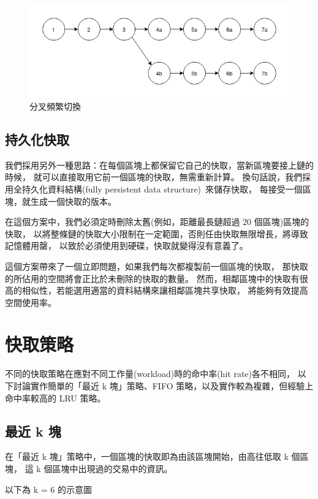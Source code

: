 \begin{figure}[h!]
\includegraphics[width=\textwidth]{快取長分叉}
\caption{分叉頻繁切換}
\end{figure}

{\color{red}
\subsection{持久化快取}

我們採用另外一種思路：在每個區塊上都保留它自己的快取，當新區塊要接上鏈的時候，
就可以直接取用它前一個區塊的快取，無需重新計算。
換句話說，我們採用全持久化資料結構(fully persistent data structure)~\cite{driscoll1986making}來儲存快取，
每接受一個區塊，就生成一個快取的版本。

在這個方案中，我們必須定時刪除太舊(例如，距離最長鏈超過 20 個區塊)區塊的快取，
以將整條鏈的快取大小限制在一定範圍，否則任由快取無限增長，將導致記憶體用罄，
以致於必須使用到硬碟，快取就變得沒有意義了。

這個方案帶來了一個立即問題，如果我們每次都複製前一個區塊的快取，
那快取的所佔用的空間將會正比於未刪除的快取的數量。
然而，相鄰區塊中的快取有很高的相似性，若能選用適當的資料結構來讓相鄰區塊共享快取，
將能夠有效提高空間使用率。
}

\section{快取策略}

不同的快取策略在應對不同工作量(workload)時的命中率(hit rate)各不相同，
以下討論實作簡單的「最近 k 塊」策略、FIFO 策略，以及實作較為複雜，但經驗上命中率較高的 LRU 策略。

\subsection{最近 k 塊}

在「最近 k 塊」策略中，一個區塊的快取即為由該區塊開始，由高往低取 k 個區塊，
這 k 個區塊中出現過的交易中的資訊。

以下為 k = 6 的示意圖


